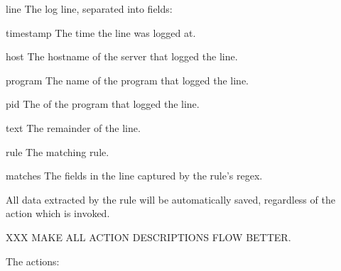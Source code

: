 \begin{eqlist}

    \item [line] The log line, separated into fields:

        \begin{eqlist}

            \item [timestamp] The time the line was logged at.

            \item [host] The hostname of the server that logged the line.

            \item [program] The name of the program that logged the line.

            \item [pid] The \pid{} of the program that logged the line.

            \item [text] The remainder of the line.

        \end{eqlist}

    \item [rule] The matching rule.

    \item [matches] The fields in the line captured by the rule's regex.

\end{eqlist}

All data extracted by the rule will be automatically saved, regardless of
the action which is invoked.

XXX MAKE ALL ACTION DESCRIPTIONS FLOW BETTER\@.  

The actions:

